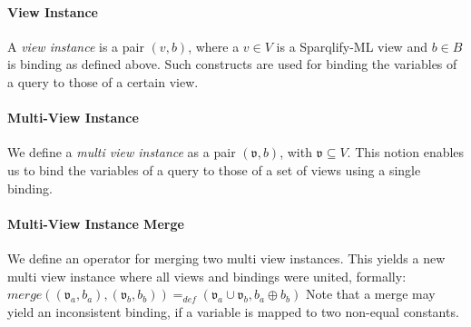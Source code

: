 \documentclass[a4paper,twoside,bibtotoc,abstracton,12pt,BCOR=15mm]{scrreprt}
\newcommand{\todo}[1]{\textbf{ToDo: \textit{#1}}}
\begin{document}






\paragraph{View Instance}
A \emph{view instance} is a pair $(v, b)$, where a $v \in V$ is a Sparqlify-ML view and $b \in B$ is binding as defined above.
Such constructs are used for binding the variables of a query to those of a certain view.

\paragraph{Multi-View Instance}
We define a \emph{multi view instance} as a pair $(\mathfrak{v}, b)$, with $\mathfrak{v} \subseteq V$. 
This notion enables us to bind the variables of a query to those of a set of views using a single binding.



\paragraph{Multi-View Instance Merge}
We define an operator for merging two multi view instances. 
This yields a new multi view instance where all views and bindings were united, formally: 
$merge((\mathfrak{v}_a, b_a), (\mathfrak{v}_b, b_b)) =_{def} (\mathfrak{v}_a \cup \mathfrak{v}_b, b_a \oplus b_b)$
Note that a merge may yield an inconsistent binding, if a variable is mapped to two non-equal constants.
\end{document}
